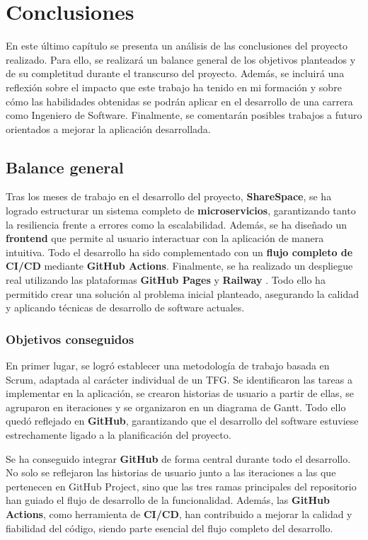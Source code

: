 \chapter{Conclusiones} \label{diseño}

En este último capítulo se presenta un análisis de las conclusiones del proyecto realizado. Para ello, se realizará un balance general de los objetivos planteados y de su completitud durante el transcurso del proyecto. Además, se incluirá una reflexión sobre el impacto que este trabajo ha tenido en mi formación y sobre cómo las habilidades obtenidas se podrán aplicar en el desarrollo de una carrera como Ingeniero de Software. Finalmente, se comentarán posibles trabajos a futuro orientados a mejorar la aplicación desarrollada.

\section{Balance general}
Tras los meses de trabajo en el desarrollo del proyecto, \textbf{ShareSpace}, se ha logrado estructurar un sistema completo de \textbf{microservicios}, garantizando tanto la resiliencia frente a errores como la escalabilidad. Además, se ha diseñado un \textbf{frontend} que permite al usuario interactuar con la aplicación de manera intuitiva. Todo el desarrollo ha sido complementado con un \textbf{flujo completo de CI/CD} mediante \textbf{GitHub Actions}. Finalmente, se ha realizado un despliegue real utilizando las plataformas \textbf{GitHub Pages} y \textbf{Railway} \cite{Railway}. Todo ello ha permitido crear una solución al problema inicial planteado, asegurando la calidad y aplicando técnicas de desarrollo de software actuales.

\subsection{Objetivos conseguidos}

En primer lugar, se logró establecer una metodología de trabajo basada en Scrum, adaptada al carácter individual de un TFG. Se identificaron las tareas a implementar en la aplicación, se crearon historias de usuario a partir de ellas, se agruparon en iteraciones y se organizaron en un diagrama de Gantt. Todo ello quedó reflejado en \textbf{GitHub}, garantizando que el desarrollo del software estuviese estrechamente ligado a la planificación del proyecto.  

Se ha conseguido integrar \textbf{GitHub} de forma central durante todo el desarrollo. No solo se reflejaron las historias de usuario junto a las iteraciones a las que pertenecen en GitHub Project, sino que las tres ramas principales del repositorio han guiado el flujo de desarrollo de la funcionalidad. Además, las \textbf{GitHub Actions}, como herramienta de \textbf{CI/CD}, han contribuido a mejorar la calidad y fiabilidad del código, siendo parte esencial del flujo completo del desarrollo.

